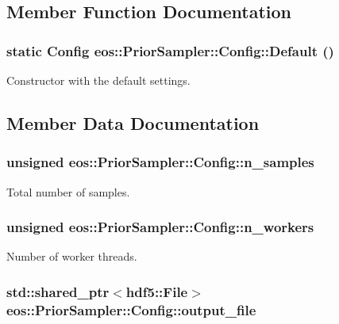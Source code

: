 \subsection{Member Function Documentation}
\hypertarget{structeos_1_1PriorSampler_1_1Config_ab56ba1088eae165d73629213c7e72450}{
\subsubsection[{Default}]{\setlength{\rightskip}{0pt plus 5cm}static {\bf Config} eos::PriorSampler::Config::Default ()}}
\label{structeos_1_1PriorSampler_1_1Config_ab56ba1088eae165d73629213c7e72450}


Constructor with the default settings. 

\subsection{Member Data Documentation}
\hypertarget{structeos_1_1PriorSampler_1_1Config_a2db80db4647764792f4370590e0cfb38}{
\subsubsection[{n\_\-samples}]{\setlength{\rightskip}{0pt plus 5cm}unsigned {\bf eos::PriorSampler::Config::n\_\-samples}}}
\label{structeos_1_1PriorSampler_1_1Config_a2db80db4647764792f4370590e0cfb38}


Total number of samples. \hypertarget{structeos_1_1PriorSampler_1_1Config_a4bb4bb97708f5dc7cd8414489a2808c9}{
\subsubsection[{n\_\-workers}]{\setlength{\rightskip}{0pt plus 5cm}unsigned {\bf eos::PriorSampler::Config::n\_\-workers}}}
\label{structeos_1_1PriorSampler_1_1Config_a4bb4bb97708f5dc7cd8414489a2808c9}


Number of worker threads. \hypertarget{structeos_1_1PriorSampler_1_1Config_ab11de7880341b9e9ea13e9332f574483}{
\subsubsection[{output\_\-file}]{\setlength{\rightskip}{0pt plus 5cm}std::shared\_\-ptr$<${\bf hdf5::File}$>$ {\bf eos::PriorSampler::Config::output\_\-file}}}
\label{structeos_1_1PriorSampler_1_1Config_ab11de7880341b9e9ea13e9332f574483}


